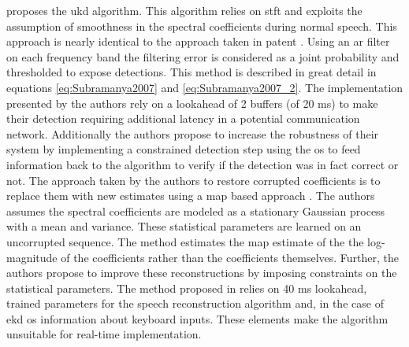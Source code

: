 \cite{Subramanya2007} proposes the \gls{ukd} algorithm. This algorithm relies on \gls{stft} and exploits the assumption of smoothness in the spectral coefficients during normal speech. This approach is nearly identical to the approach taken in patent \cite{Seltzer2011Patent}. Using an \gls{ar} filter on each frequency band the filtering error is considered as a joint probability and thresholded to expose detections. This method is described in great detail in equations \ref{eq:Subramanya2007} and \ref{eq:Subramanya2007_2}. The implementation presented by the authors rely on a lookahead of 2 buffers (of 20 ms) to make their detection requiring additional latency in a potential communication network. Additionally the authors propose to increase the robustness of their system by implementing a constrained detection step using the \gls{os} to feed information back to the algorithm to verify if the detection was in fact correct or not. The approach taken by the authors to restore corrupted coefficients is to replace them with new estimates using a \gls{map} based approach \cite{Raj2004}. The authors assumes the spectral coefficients are modeled as a stationary Gaussian process with a mean and variance. These statistical parameters are learned on an uncorrupted sequence. The method estimates the \gls{map} estimate of the the log-magnitude of the coefficients rather than the coefficients themselves. Further, the authors propose to improve these reconstructions by imposing constraints on the statistical parameters.
The method proposed in \cite{Subramanya2007} relies on 40 ms lookahead, trained parameters for the speech reconstruction algorithm and, in the case of \gls{ekd} \gls{os} information about keyboard inputs. These elements make the algorithm unsuitable for real-time implementation.

